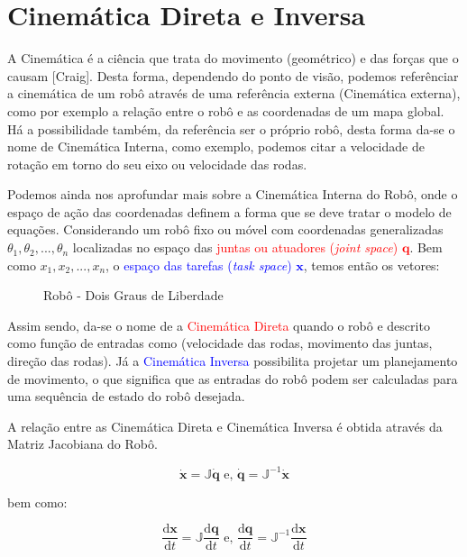 \section{Cinemática Direta e Inversa}\label{intro-ch1}

A Cinemática é a ciência que trata do movimento (geométrico) e das forças que o causam [Craig]. Desta forma, dependendo do ponto de visão,
podemos referênciar a cinemática de um robô através de uma referência externa (Cinemática externa), como por exemplo a relação entre o robô e
as coordenadas de um mapa global. Há a possibilidade também, da referência ser o próprio robô, desta forma da-se o nome de
Cinemática Interna, como exemplo, podemos citar a velocidade de rotação em torno do seu eixo ou velocidade das rodas.

Podemos ainda nos aprofundar mais sobre a Cinemática Interna do Robô, onde o espaço de ação das coordenadas definem a forma que se deve tratar o modelo de equações.
Considerando um robô fixo ou móvel com coordenadas generalizadas $\theta_1, \theta_2,..., \theta_n$ localizadas no espaço das \textcolor{red}{juntas ou atuadores (\textit{joint space}) $\mathbf{q}$}. Bem como $x_1, x_2,..., x_n$, o \textcolor{blue}{espaço das tarefas (\textit{task space}) $\mathbf{x}$}, temos então os vetores:

\begin{figure}[!ht]

\caption{Robô - Dois Graus de Liberdade}
\label{fig:2dof-robot}
\end{figure}

Assim sendo, da-se o nome de a \textcolor{red}{Cinemática Direta} quando o robô e descrito como função de entradas como (velocidade das rodas, movimento das juntas, direção das rodas).  Já a \textcolor{blue}{Cinemática Inversa} possibilita projetar um planejamento de movimento, o que significa que as entradas do robô podem ser calculadas para uma sequência de estado do robô desejada.

A relação entre as Cinemática Direta e Cinemática Inversa é obtida através da Matriz Jacobiana do Robô.

\begin{equation*}
    \mathbf{\dot{x}} = \mathbb{J}{\mathbf{\dot{q}}}
    \text{ e, }
    \mathbf{\dot{q}} = \mathbb{J}^{-1}{\mathbf{\dot{x}}}
\end{equation*}

bem como:

\begin{equation*}
    \frac{\text{d}\mathbf{x}}{\text{d}t} = \mathbb{J}\frac{\text{d}\mathbf{q}}{\text{d}t}
    \text{ e, }
    \frac{\text{d}\mathbf{q}}{\text{d}t} = \mathbb{J}^{-1}\frac{\text{d}\mathbf{x}}{\text{d}t}
\end{equation*}

